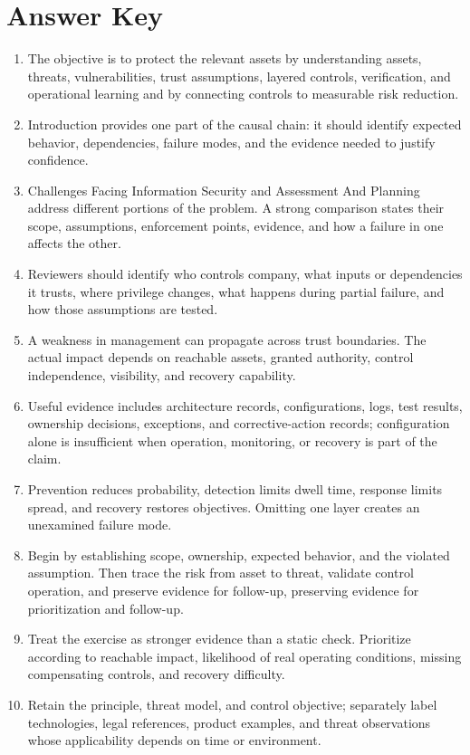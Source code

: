 \documentclass[11pt,letterpaper]{article}
\begin{document}
\section*{Answer Key}
\begin{enumerate}
\item The objective is to protect the relevant assets by understanding assets, threats, vulnerabilities, trust assumptions, layered controls, verification, and operational learning and by connecting controls to measurable risk reduction.
\item Introduction provides one part of the causal chain: it should identify expected behavior, dependencies, failure modes, and the evidence needed to justify confidence.
\item Challenges Facing Information Security and Assessment And Planning address different portions of the problem. A strong comparison states their scope, assumptions, enforcement points, evidence, and how a failure in one affects the other.
\item Reviewers should identify who controls company, what inputs or dependencies it trusts, where privilege changes, what happens during partial failure, and how those assumptions are tested.
\item A weakness in management can propagate across trust boundaries. The actual impact depends on reachable assets, granted authority, control independence, visibility, and recovery capability.
\item Useful evidence includes architecture records, configurations, logs, test results, ownership decisions, exceptions, and corrective-action records; configuration alone is insufficient when operation, monitoring, or recovery is part of the claim.
\item Prevention reduces probability, detection limits dwell time, response limits spread, and recovery restores objectives. Omitting one layer creates an unexamined failure mode.
\item Begin by establishing scope, ownership, expected behavior, and the violated assumption. Then trace the risk from asset to threat, validate control operation, and preserve evidence for follow-up, preserving evidence for prioritization and follow-up.
\item Treat the exercise as stronger evidence than a static check. Prioritize according to reachable impact, likelihood of real operating conditions, missing compensating controls, and recovery difficulty.
\item Retain the principle, threat model, and control objective; separately label technologies, legal references, product examples, and threat observations whose applicability depends on time or environment.
\end{enumerate}
\end{document}
